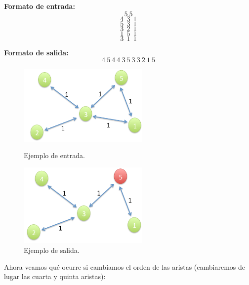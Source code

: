 \textbf{Formato de entrada:}
$$5\ 5$$
$$4\ \ 3\ \ 1$$
$$5\ \ 3\ \ 1$$
$$3\ \ 2\ \ 1$$
$$1\ \ 5\ \ 1$$
$$3\ \ 1\ \ 1$$

\textbf{Formato de salida:}
$$4\ 5\ 4\ 4\ 3\ 5\ 3\ 3\ 2\ 1\ 5$$

\newline

\begin{figure}[H] %
\begin{minipage}[H]{180pt}
\includegraphics[width=180pt]{../imgs/pregAdicional01.jpg}
\caption{Ejemplo de entrada.}
\end{minipage}
\hfill
\begin{minipage}[H]{180pt}
    \includegraphics[width=180pt]{../imgs/pregAdicional02.jpg}
    \caption{Ejemplo de salida.}
\end{minipage}
\end{figure}

 Ahora veamos qué ocurre si cambiamos el orden de las aristas (cambiaremos de lugar las cuarta y quinta aristas):

